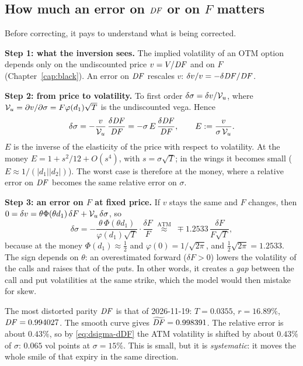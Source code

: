\subsection{How much an error on \texorpdfstring{$\mathit{DF}$}{DF} or on \texorpdfstring{$F$}{F} matters}
Before correcting, it pays to understand what is being corrected.

\textbf{Step 1: what the inversion sees.} The implied volatility of an OTM option depends only on the undiscounted
price $v=V/\mathit{DF}$ and on $F$ (Chapter~\ref{cap:black}). An error on $\mathit{DF}$ rescales $v$: $\delta v/v=-\delta\mathit{DF}/\mathit{DF}$.

\textbf{Step 2: from price to volatility.} To first order $\delta\sigma=\delta v/\mathcal{V}_u$, where
$\mathcal{V}_u=\partial v/\partial\sigma=F\varphi(d_1)\sqrt T$ is the undiscounted vega. Hence
\begin{equation}\label{eq:dsigma-dDF}
\delta\sigma=-\frac{v}{\mathcal{V}_u}\,\frac{\delta\mathit{DF}}{\mathit{DF}}=-\sigma\,E\,\frac{\delta\mathit{DF}}{\mathit{DF}},
\qquad E:=\frac{v}{\sigma\,\mathcal{V}_u}.
\end{equation}
$E$ is the inverse of the elasticity of the price with respect to volatility. At the money $E=1+s^2/12+O(s^4)$, with
$s=\sigma\sqrt T$; in the wings it becomes small ($E\approx1/(|d_1||d_2|)$). The worst case is therefore at the
money, where a relative error on $\mathit{DF}$ becomes the same relative error on $\sigma$.

\textbf{Step 3: an error on $F$ at fixed price.} If $v$ stays the same and $F$ changes, then
$0=\delta v=\theta\Phi(\theta d_1)\,\delta F+\mathcal{V}_u\,\delta\sigma$, so
\begin{equation}\label{eq:dsigma-dF}
\delta\sigma=-\frac{\theta\,\Phi(\theta d_1)}{\varphi(d_1)\sqrt T}\cdot\frac{\delta F}{F}
\;\overset{\text{ATM}}{\approx}\;\mp1.2533\,\frac{\delta F}{F\sqrt T},
\end{equation}
because at the money $\Phi(d_1)\approx\tfrac12$ and $\varphi(0)=1/\sqrt{2\pi}$, and $\tfrac12\sqrt{2\pi}=1.2533$. The
sign depends on $\theta$: an overestimated forward ($\delta F>0$) lowers the volatility of the calls and raises that
of the puts. In other words, it creates a \emph{gap} between the call and put volatilities at the same strike, which
the model would then mistake for skew.

\begin{esempio}[title={Example: the worst expiry (estimate)}]
The most distorted parity $\mathit{DF}$ is that of \mbox{2026-11-19}: $T=0.0355$, $r=16.89\%$, $\mathit{DF}=0.994027$. The smooth curve
gives $\widetilde{\mathit{DF}}=0.998391$. The relative error is about $0.43\%$, so by \eqref{eq:dsigma-dDF} the ATM
volatility is shifted by about $0.43\%$ of $\sigma$: $0.065$ vol points at $\sigma=15\%$. This is small, but it is
\emph{systematic}: it moves the whole smile of that expiry in the same direction.
\end{esempio}

